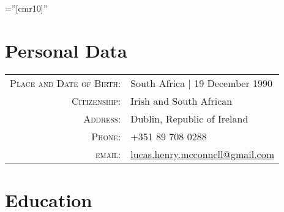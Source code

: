 \documentclass[a4paper,10pt]{article} %
\begin{document}
\pagestyle{empty} %

\font\fb=''[cmr10]'' %


\par{\bigskip\par} %

\section{Personal Data}

\begin{tabular}{rl}
\textsc{Place and Date of Birth:} & South Africa  | 19 December 1990 \\
\textsc{Citizenship:} & Irish and South African \\
\textsc{Address:} & Dublin, Republic of Ireland \\
\textsc{Phone:} & +351 89 708 0288\\
\textsc{email:} & \href{mailto:lucas.henry.mcconnell@gmail.com}{lucas.henry.mcconnell@gmail.com}
\end{tabular}


\section{Education}
\end{document}
